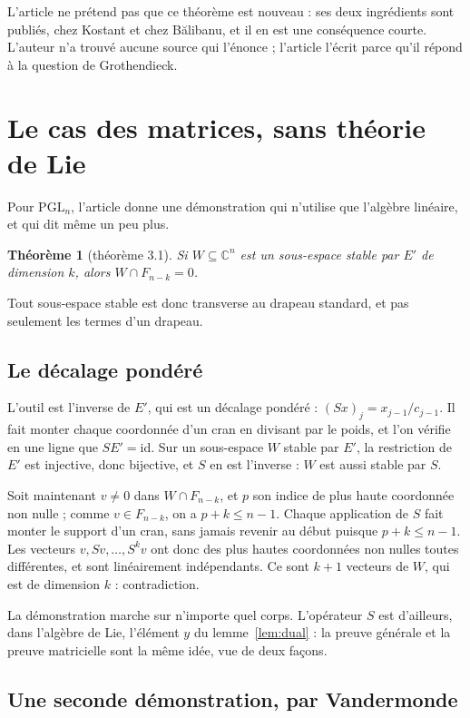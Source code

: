 \documentclass[11pt,a4paper]{amsart}
\theoremstyle{definition}
\theoremstyle{plain}
\newtheorem{theoreme}{Théorème}
\theoremstyle{remark}
\newcommand{\C}{\mathbb C}
\newcommand{\PGL}{\mathrm{PGL}}
\begin{document}
L'article ne prétend pas que ce théorème est nouveau : ses deux ingrédients sont publiés, chez Kostant et chez Bălibanu, et il en est une conséquence courte. L'auteur n'a trouvé aucune source qui l'énonce ; l'article l'écrit parce qu'il répond à la question de Grothendieck.

\section{Le cas des matrices, sans théorie de Lie}

Pour $\PGL_n$, l'article donne une démonstration qui n'utilise que l'algèbre linéaire, et qui dit même un peu plus.

\begin{theoreme}[théorème 3.1]\label{thm:A}
Si $W \subseteq \C^n$ est un sous-espace stable par $E'$ de dimension $k$, alors $W \cap F_{n-k} = 0$.
\end{theoreme}

Tout sous-espace stable est donc transverse au drapeau standard, et pas seulement les termes d'un drapeau.

\subsection{Le décalage pondéré}

L'outil est l'inverse de $E'$, qui est un décalage pondéré : $(Sx)_j = x_{j-1}/c_{j-1}$. Il fait monter chaque coordonnée d'un cran en divisant par le poids, et l'on vérifie en une ligne que $SE' = \mathrm{id}$. Sur un sous-espace $W$ stable par $E'$, la restriction de $E'$ est injective, donc bijective, et $S$ en est l'inverse : $W$ est aussi stable par $S$.

Soit maintenant $v \neq 0$ dans $W \cap F_{n-k}$, et $p$ son indice de plus haute coordonnée non nulle ; comme $v \in F_{n-k}$, on a $p + k \le n-1$. Chaque application de $S$ fait monter le support d'un cran, sans jamais revenir au début puisque $p + k \le n - 1$. Les vecteurs $v, Sv, \dots, S^k v$ ont donc des plus hautes coordonnées non nulles toutes différentes, et sont linéairement indépendants. Ce sont $k+1$ vecteurs de $W$, qui est de dimension $k$ : contradiction.

La démonstration marche sur n'importe quel corps. L'opérateur $S$ est d'ailleurs, dans l'algèbre de Lie, l'élément $y$ du lemme~\ref{lem:dual} : la preuve générale et la preuve matricielle sont la même idée, vue de deux façons.

\subsection{Une seconde démonstration, par Vandermonde}
\end{document}
